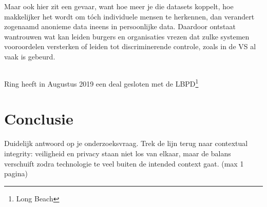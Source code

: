 \documentclass[nonacm,sigconf]{acmart}
\begin{document}
    Maar ook hier zit een gevaar, want hoe meer je die datasets koppelt, hoe makkelijker het wordt om tóch individuele mensen te herkennen, dan verandert zogenaamd anonieme data ineens in persoonlijke data.
    Daardoor ontstaat wantrouwen wat kan leiden burgers en organisaties vrezen dat zulke systemen vooroordelen versterken of leiden tot discriminerende controle, zoals in de VS al vaak is gebeurd.

    \subsection{}
    \parencite{shaffer2021applying}
    Ring heeft in Augustus 2019 een deal gesloten met de LBPD\footnote{Long Beach }


    \section{Conclusie}
    Duidelijk antwoord op je onderzoeksvraag.
    Trek de lijn terug naar contextual integrity: veiligheid en privacy staan niet los van elkaar, maar de balans verschuift zodra technologie te veel buiten de intended context gaat. (max 1 pagina)

    \printbibliography

    \balance %
\end{document}

